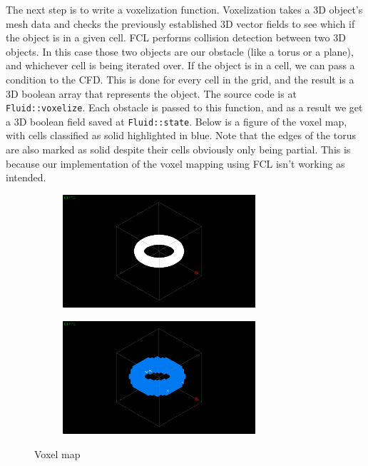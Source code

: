 \documentclass[a4paper,12pt,titlepage]{article}
\begin{document}
The next step is to write a voxelization function. Voxelization takes a 3D
object's mesh data and checks the previously established 3D vector fields to see which
if the object is in a given cell. FCL performs collision detection between two 3D objects.
In this case those two objects are our obstacle (like a torus or a plane), and
whichever cell is being iterated over. If the object is in a cell, we can pass a
condition to the CFD. This is done for every cell in the grid, and the result
is a 3D boolean array that represents the object. The source code is at \lstinline{Fluid::voxelize}.
Each obstacle is passed to this function, and as a result we get a 3D boolean
field saved at \lstinline{Fluid::state}. Below is a figure of the voxel map,
with cells classified as solid highlighted in blue. Note that the edges of the
torus are also marked as solid despite their cells obviously only being partial.
This is because our implementation of the voxel mapping using FCL isn't working
as intended.

\begin{figure}[H]
    \centering
    \begin{subfigure}[t]{0.45\textwidth}
        \centering
        \includegraphics[height=1.65in]{resources/voxelize1.png}
		\caption{}
    \end{subfigure}
    \hfill
    \begin{subfigure}[t]{0.45\textwidth}
        \centering
        \includegraphics[height=1.65in]{resources/voxelize2.png}
		\caption{}
		\label{fig:voxelmap}
	\end{subfigure} 
    \caption{Voxel map}
\end{figure}
\end{document}
